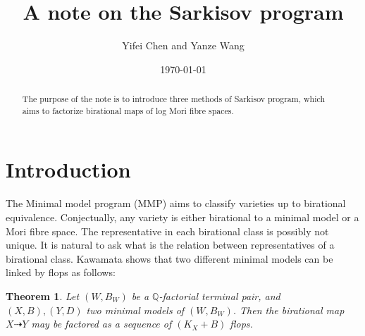 \documentclass[11pt]{amsart}
\newtheorem{thm}[defn]{Theorem}
\begin{document}
\title{A note on the Sarkisov program}

\author{Yifei Chen and Yanze Wang}

\begin{abstract}
The purpose of the note is to introduce three methods of Sarkisov program, which aims to factorize birational maps of log Mori fibre spaces.
\end{abstract}
\address{Academy of Mathematics and Systems Science,
Chinese Academy of Sciences.
No. 55 Zhonguancun East Road, Haidian District,
Beijing 100190, P. R. China.}

\date{\today}


\maketitle

\tableofcontents


\section{Introduction}

The Minimal model program (MMP)  aims to classify varieties up to birational equivalence.
Conjectually, any variety is either birational to  a minimal model  or a Mori fibre space. The representative in each birational class is possibly not unique. It is natural to ask what is the relation between representatives of a birational class.
Kawamata shows that two different minimal models can be linked by flops as follows:
\begin{thm}
  \cite[Theorem 1]{kawamataFlopsConnectMinimal2008} Let $(W,B_W)$ be a $\mathbb{Q}$-factorial terminal pair, and $(X,B),(Y,D)$  two minimal models of $(W,B_W)$. Then the birational map $X\dashrightarrow Y$ may be factored as a sequence of $(K_X+B)$ flops. 
\end{thm}
\end{document}
